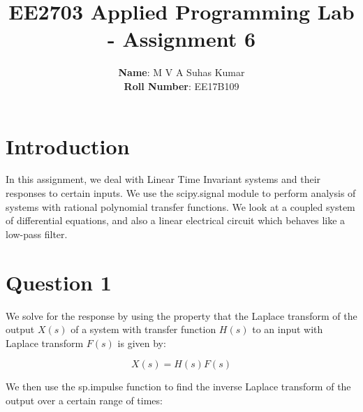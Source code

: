 \documentclass[11pt]{article}
\title{EE2703 Applied Programming Lab - Assignment 6}
\author{
  \textbf{Name}: M V A Suhas Kumar\\
  \textbf{Roll Number}: EE17B109
}
\begin{document}
    
    
    \maketitle
    
    

    
	

	
		
    \section{Introduction}\label{introduction}

In this assignment, we deal with Linear Time Invariant systems and their
responses to certain inputs. We use the scipy.signal module to perform
analysis of systems with rational polynomial transfer functions. We look
at a coupled system of differential equations, and also a linear
electrical circuit which behaves like a low-pass filter.

	

	

	

	

	
		
    \section{Question 1}\label{question-1}

We solve for the response by using the property that the Laplace
transform of the output \(X(s)\) of a system with transfer function
\(H(s)\) to an input with Laplace transform \(F(s)\) is given by:

\[X(s) = H(s) F(s)\]

We then use the sp.impulse function to find the inverse Laplace
transform of the output over a certain range of times:

	

	
		
	
	
		
	
		
			
		
	
		
			
		
	
		
			
		
	
		
			
		
	
		
			
		
	
		
			
\end{document}
